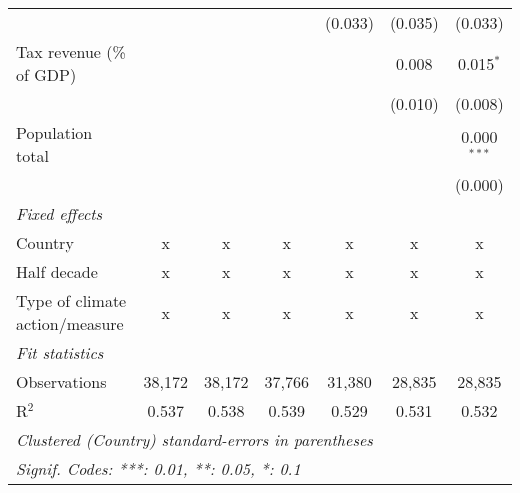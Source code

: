 \begin{tabular}{lcccccc}
                                                            &         &               &               & (0.033)       & (0.035)       & (0.033)\\   
   Tax revenue (\% of GDP)                                  &         &               &               &               & 0.008         & 0.015$^{*}$\\   
                                                            &         &               &               &               & (0.010)       & (0.008)\\   
   Population total                                         &         &               &               &               &               & 0.000$^{***}$\\   
                                                            &         &               &               &               &               & (0.000)\\   
   \emph{Fixed effects}\\
   Country                                                  & x       & x             & x             & x             & x             & x\\  
   Half decade                                              & x       & x             & x             & x             & x             & x\\  
   Type of climate action/measure                           & x       & x             & x             & x             & x             & x\\  
   \midrule \emph{Fit statistics}\\
   Observations                                             & 38,172  & 38,172        & 37,766        & 31,380        & 28,835        & 28,835\\  
   R$^2$                                                    & 0.537   & 0.538         & 0.539         & 0.529         & 0.531         & 0.532\\  
   \midrule
   \multicolumn{7}{l}{\emph{Clustered (Country) standard-errors in parentheses}}\\
   \multicolumn{7}{l}{\emph{Signif. Codes: ***: 0.01, **: 0.05, *: 0.1}}\\
\end{tabular}
\par\endgroup


